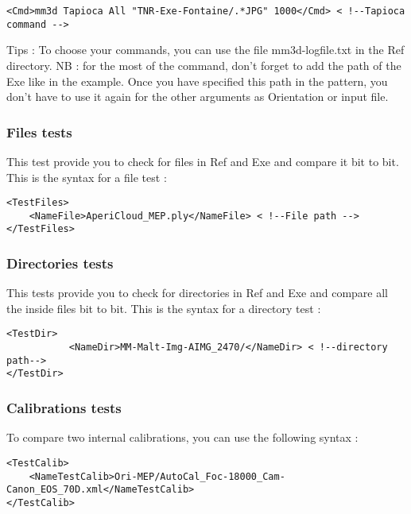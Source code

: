 \documentclass[a4paper]{book}
\begin{document}
\begin{lstlisting}
<Cmd>mm3d Tapioca All "TNR-Exe-Fontaine/.*JPG" 1000</Cmd> < !--Tapioca command -->
\end{lstlisting}

Tips : To choose your commands, you can use the file mm3d-logfile.txt in the Ref directory.
NB : for the most of the command, don't forget to add the path of the Exe like in the example. Once you have specified this path in the pattern, you don't have to use it again for the other arguments as Orientation or input file.

\subsubsection{Files tests}
This test provide you to check for files in Ref and Exe and compare it bit to bit. This is the syntax for a file test :

\begin{lstlisting}
<TestFiles> 
	<NameFile>AperiCloud_MEP.ply</NameFile> < !--File path --> 
</TestFiles>
\end{lstlisting}

\subsubsection{Directories tests}
This tests provide you to check for directories in Ref and Exe and compare all the inside files bit to bit. This is the syntax for a directory test :

\begin{lstlisting}
<TestDir> 
           <NameDir>MM-Malt-Img-AIMG_2470/</NameDir> < !--directory path-->
</TestDir>
\end{lstlisting}

\subsubsection{Calibrations tests}
To compare two internal calibrations, you can use the following syntax :

\begin{lstlisting}
<TestCalib> 
	<NameTestCalib>Ori-MEP/AutoCal_Foc-18000_Cam-Canon_EOS_70D.xml</NameTestCalib> 
</TestCalib>
\end{lstlisting}
\end{document}
